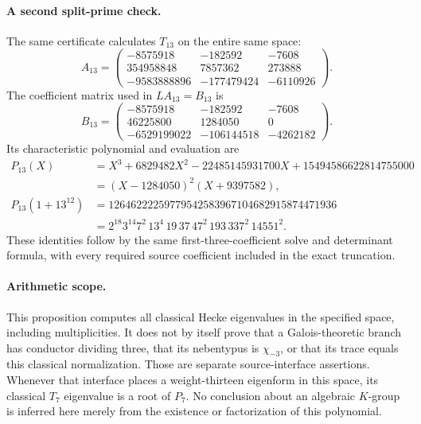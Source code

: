 \paragraph{A second split-prime check.}
The same certificate calculates $T_{13}$ on the entire same space:
\[
 A_{13}=
 \begin{pmatrix}
 -8575918&-182592&-7608\\
 354958848&7857362&273888\\
 -9583888896&-177479424&-6110926
 \end{pmatrix}.
\]
The coefficient matrix used in $LA_{13}=B_{13}$ is
\[
 B_{13}=
 \begin{pmatrix}
 -8575918&-182592&-7608\\
 46225800&1284050&0\\
 -6529199022&-106144518&-4262182
 \end{pmatrix}.
\]
Its characteristic polynomial and evaluation are
\begin{align*}
 P_{13}(X)
 &=X^3+6829482X^2-22485145931700X+15494586622814755000\\
 &=(X-1284050)^2(X+9397582),\\
 P_{13}(1+13^{12})
 &=12646222259779542583967104682915874471936\\
 &=2^{18}3^{14}7^2\,13^4\,19\,37\,47^2\,193\,337^2\,14551^2.
\end{align*}
These identities follow by the same first-three-coefficient solve and
determinant formula, with every required source coefficient included in
the exact truncation.

\paragraph{Arithmetic scope.}
This proposition computes all classical Hecke eigenvalues in the
specified space, including multiplicities. It does not by itself prove
that a Galois-theoretic branch has conductor dividing three, that its
nebentypus is $\chi_{-3}$, or that its trace equals this classical
normalization. Those are separate source-interface assertions. Whenever
that interface places a weight-thirteen eigenform in this space,
its classical $T_7$ eigenvalue is a root of $P_7$.
No conclusion about an algebraic $K$-group is inferred here merely from
the existence or factorization of this polynomial.
